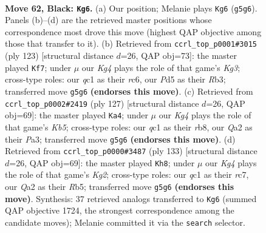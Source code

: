 \documentclass[11pt]{article}
\begin{document}
\clearpage

\begin{figure}[p]\centering
\begin{subfigure}{0.46\textwidth}\centering
\resizebox{\linewidth}{!}{%
\newchessgame
\chessboard[
  setfen={8/8/5p2/3p2k1/4r3/6PK/q6P/2Q5 b - - 5 62},
  showmover=false,
  pgfstyle=straightmove, color=movearrow, markmove={g5-g6}
]}
\caption{}
\end{subfigure}\hfill
\begin{subfigure}{0.46\textwidth}\centering
\resizebox{\linewidth}{!}{%
\newchessgame
\chessboard[
  setfen={8/7p/2R3k1/8/6PK/1r3p1P/8/8 b - - 3 62},
  showmover=false,
  pgfstyle=straightmove, color=movearrow, markmove={g6-f7}
]}
\caption{}
\end{subfigure}
\\[4pt]
\begin{subfigure}{0.46\textwidth}\centering
\resizebox{\linewidth}{!}{%
\newchessgame
\chessboard[
  setfen={1R6/3r4/6P1/2p5/1k6/p3PK2/5P2/8 b - - 18 64},
  showmover=false,
  pgfstyle=straightmove, color=movearrow, markmove={b4-a4}
]}
\caption{}
\end{subfigure}\hfill
\begin{subfigure}{0.46\textwidth}\centering
\resizebox{\linewidth}{!}{%
\newchessgame
\chessboard[
  setfen={8/2R3k1/6p1/pr4P1/5PK1/8/8/8 b - - 8 67},
  showmover=false,
  pgfstyle=straightmove, color=movearrow, markmove={g7-h8}
]}
\caption{}
\end{subfigure}
\caption{\textbf{Move 62, Black: \texttt{Kg6}.} (a) Our position; Melanie plays \texttt{Kg6} (\texttt{g5g6}). Panels (b)--(d) are the retrieved master positions whose correspondence most drove this move (highest QAP objective among those that transfer to it). (b) Retrieved from \texttt{ccrl\_top\_p0001\#3015} (ply 123) [structural distance $d$=26, QAP obj=73]: the master played \texttt{Kf7}; under $\mu$ our \emph{Kg4} plays the role of that game's \emph{Kg3}; cross-type roles: our \emph{q}c1 as their \emph{r}c6, our \emph{P}d5 as their \emph{R}b3; transferred move \texttt{g5g6} \textbf{(endorses this move)}. (c) Retrieved from \texttt{ccrl\_top\_p0002\#2419} (ply 127) [structural distance $d$=26, QAP obj=69]: the master played \texttt{Ka4}; under $\mu$ our \emph{Kg4} plays the role of that game's \emph{Kb5}; cross-type roles: our \emph{q}c1 as their \emph{r}b8, our \emph{Q}a2 as their \emph{P}a3; transferred move \texttt{g5g6} \textbf{(endorses this move)}. (d) Retrieved from \texttt{ccrl\_top\_p0000\#3487} (ply 133) [structural distance $d$=26, QAP obj=69]: the master played \texttt{Kh8}; under $\mu$ our \emph{Kg4} plays the role of that game's \emph{Kg2}; cross-type roles: our \emph{q}c1 as their \emph{r}c7, our \emph{Q}a2 as their \emph{R}b5; transferred move \texttt{g5g6} \textbf{(endorses this move)}. Synthesis: 37 retrieved analogs transferred to \texttt{Kg6} (summed QAP objective 1724, the strongest correspondence among the candidate moves); Melanie committed it via the \texttt{search} selector.}
\label{fig:thought-m123}
\end{figure}
\end{document}
